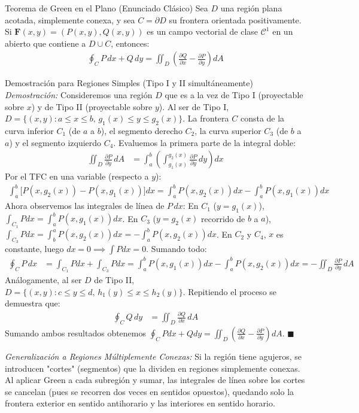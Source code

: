 \documentclass[11pt,a4paper]{article}
\begin{document}
\begin{teoremabox}{Teorema de Green en el Plano (Enunciado Clásico)}
Sea $D$ una región plana acotada, simplemente conexa, y sea $C = \partial D$ su frontera orientada positivamente. Si $\mathbf{F}(x,y) = (P(x,y), Q(x,y))$ es un campo vectorial de clase $\mathcal{C}^1$ en un abierto que contiene a $D \cup C$, entonces:
\begin{align*}
\oint_C P \, dx + Q \, dy = \iint_D \left( \frac{\partial Q}{\partial x} - \frac{\partial P}{\partial y} \right) dA
\end{align*}
\end{teoremabox}

\begin{teoremabox}{Demostración para Regiones Simples (Tipo I y II simultáneamente)}
\textit{Demostración:}
Consideremos una región $D$ que es a la vez de Tipo I (proyectable sobre $x$) y de Tipo II (proyectable sobre $y$).
Al ser de Tipo I, $D = \{(x,y) : a \le x \le b, \, g_1(x) \le y \le g_2(x)\}$.
La frontera $C$ consta de la curva inferior $C_1$ (de $a$ a $b$), el segmento derecho $C_2$, la curva superior $C_3$ (de $b$ a $a$) y el segmento izquierdo $C_4$.
Evaluemos la primera parte de la integral doble:
\begin{align*}
\iint_D \frac{\partial P}{\partial y} \, dA &= \int_a^b \left( \int_{g_1(x)}^{g_2(x)} \frac{\partial P}{\partial y} \, dy \right) dx
\end{align*}
Por el TFC en una variable (respecto a $y$):
\begin{align*}
\int_a^b \big[ P(x, g_2(x)) - P(x, g_1(x)) \big] dx = \int_a^b P(x, g_2(x)) dx - \int_a^b P(x, g_1(x)) dx
\end{align*}
Ahora observemos las integrales de línea de $P\, dx$:
En $C_1$ ($y=g_1(x)$), $\int_{C_1} P dx = \int_a^b P(x, g_1(x)) dx$.
En $C_3$ ($y=g_2(x)$ recorrido de $b$ a $a$), $\int_{C_3} P dx = \int_b^a P(x, g_2(x)) dx = - \int_a^b P(x, g_2(x)) dx$.
En $C_2$ y $C_4$, $x$ es constante, luego $dx = 0 \implies \int P dx = 0$.
Sumando todo:
\begin{align*}
\oint_C P \, dx &= \int_{C_1} P dx + \int_{C_3} P dx = \int_a^b P(x, g_1(x)) dx - \int_a^b P(x, g_2(x)) dx = - \iint_D \frac{\partial P}{\partial y} \, dA
\end{align*}
Análogamente, al ser $D$ de Tipo II, $D = \{(x,y) : c \le y \le d, \, h_1(y) \le x \le h_2(y)\}$. Repitiendo el proceso se demuestra que:
\begin{align*}
\oint_C Q \, dy &= \iint_D \frac{\partial Q}{\partial x} \, dA
\end{align*}
Sumando ambos resultados obtenemos $\oint_C P dx + Q dy = \iint_D (\frac{\partial Q}{\partial x} - \frac{\partial P}{\partial y}) dA$. $\blacksquare$

\textit{Generalización a Regiones Múltiplemente Conexas:} Si la región tiene agujeros, se introducen "cortes" (segmentos) que la dividen en regiones simplemente conexas. Al aplicar Green a cada subregión y sumar, las integrales de línea sobre los cortes se cancelan (pues se recorren dos veces en sentidos opuestos), quedando solo la frontera exterior en sentido antihorario y las interiores en sentido horario.
\end{teoremabox}
\end{document}
